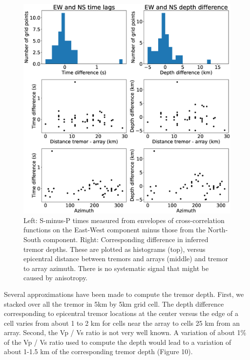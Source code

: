 \documentclass[draft]{agujournal2019}
\begin{document}
\begin{figure}
\noindent\includegraphics[width=\textwidth, trim={0cm 0cm 0cm 0cm},clip]{figures/PWS_PWS_0.eps}
\caption{Left: S-minus-P times measured from envelopes of cross-correlation functions on the East-West component minus those from the North-South component. Right: Corresponding difference in inferred tremor depths.  These are plotted as histograms (top), versus epicentral distance between tremors and arrays (middle) and tremor to array azimuth. There is no systematic signal that might be caused by anisotropy.}
\label{pngfiguresample}
\end{figure}

Several approximations have been made to compute the tremor depth. First, we stacked over all the tremor in 5km by 5km grid cell. The depth difference corresponding to epicentral tremor locations at the center versus the edge of a cell varies from about 1 to 2 km for cells near the array to cells 25 km from an array. Second, the Vp / Vs ratio is not very well known. A variation of about 1\% of the Vp / Vs ratio used to compute the depth  would lead to a variation of about 1-1.5 km of the corresponding tremor depth (Figure 10). \\
\end{document}
